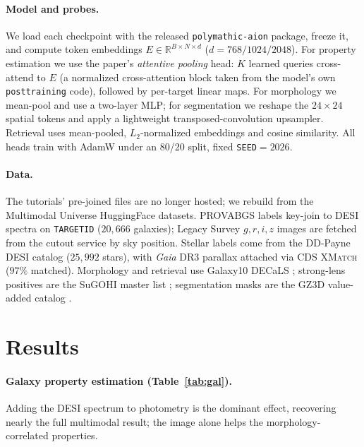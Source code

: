 \documentclass[11pt,letterpaper]{article}
\begin{document}
\paragraph{Model and probes.} We load each checkpoint with the released
\texttt{polymathic-aion} package, freeze it, and compute token embeddings
$E\in\mathbb{R}^{B\times N\times d}$ ($d=768/1024/2048$). For property
estimation we use the paper's \emph{attentive pooling} head: $K$ learned queries
cross-attend to $E$ (a normalized cross-attention block taken from the model's
own \texttt{posttraining} code), followed by per-target linear maps. For
morphology we mean-pool and use a two-layer MLP; for segmentation we reshape the
$24\times24$ spatial tokens and apply a lightweight transposed-convolution
upsampler. Retrieval uses mean-pooled, $L_2$-normalized embeddings and cosine
similarity. All heads train with AdamW under an 80/20 split, fixed
\texttt{SEED}$=2026$.

\paragraph{Data.} The tutorials' pre-joined files are no longer hosted; we
rebuild from the Multimodal Universe HuggingFace datasets. PROVABGS labels
\citep{hahn2023provabgs} key-join to DESI spectra on \texttt{TARGETID}
($20{,}666$ galaxies); Legacy Survey $g,r,i,z$ images
\citep{dey2019legacysurvey} are fetched from the cutout service by sky position.
Stellar labels come from the DD-Payne DESI catalog \citep{zhang2024ddpayne}
($25{,}992$ stars), with \textit{Gaia} DR3 parallax \citep{gaia2023dr3} attached
via CDS \textsc{XMatch} ($97\%$ matched). Morphology and retrieval use Galaxy10
DECaLS \citep{walmsley2022gzdecals}; strong-lens positives are the SuGOHI master
list \citep{jaelani2024sugohi}; segmentation masks are the GZ3D value-added
catalog \citep{masters2021gz3d}.

\section{Results}
\paragraph{Galaxy property estimation (Table~\ref{tab:gal}).} Adding the DESI
spectrum to photometry is the dominant effect, recovering nearly the full
multimodal result; the image alone helps the morphology-correlated properties.
\end{document}
